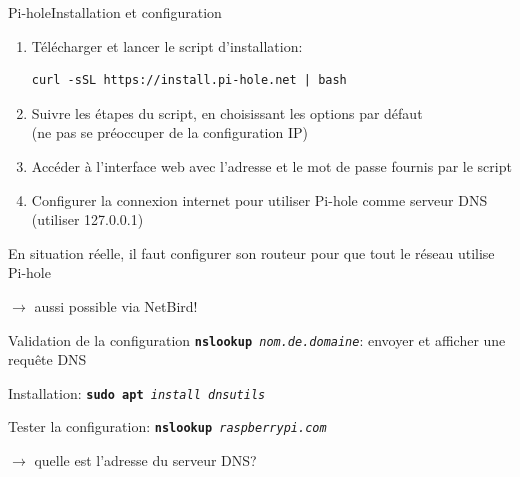 \documentclass[
aspectratio=169 %
]{beamer}
\newcommand{\cmd}[1]{\texttt{\textbf{#1}}}
\newcommand{\args}[1]{\texttt{\textit{#1}}}
\begin{document}
\begin{frame}[fragile]{Pi-hole}{Installation et configuration}
    \begin{enumerate}
        \item Télécharger et lancer le script d'installation:
              \begin{verbatim}
curl -sSL https://install.pi-hole.net | bash \end{verbatim}

        \item Suivre les étapes du script, en choisissant les options par
              défaut\\(ne pas se préoccuper de la configuration IP)
        \item Accéder à l'interface web avec l'adresse et le mot de passe
              fournis par le script
        \item Configurer la connexion internet pour utiliser Pi-hole comme
              serveur DNS\\(utiliser 127.0.0.1)
    \end{enumerate}

    \bigskip
    \bigskip
    En situation réelle, il faut configurer son routeur pour que tout le réseau
    utilise Pi-hole

    \(\rightarrow\) aussi possible via NetBird!
\end{frame}

\begin{frame}{Validation de la configuration}
    \cmd{nslookup}\args{ nom.de.domaine}: envoyer et afficher une requête DNS

    \bigskip
    Installation:
    \cmd{sudo apt}\args{ install dnsutils}

    \bigskip
    Tester la configuration:
    \cmd{nslookup}\args{ raspberrypi.com}

    \(\rightarrow\) quelle est l'adresse du serveur DNS?
\end{frame}
\end{document}
